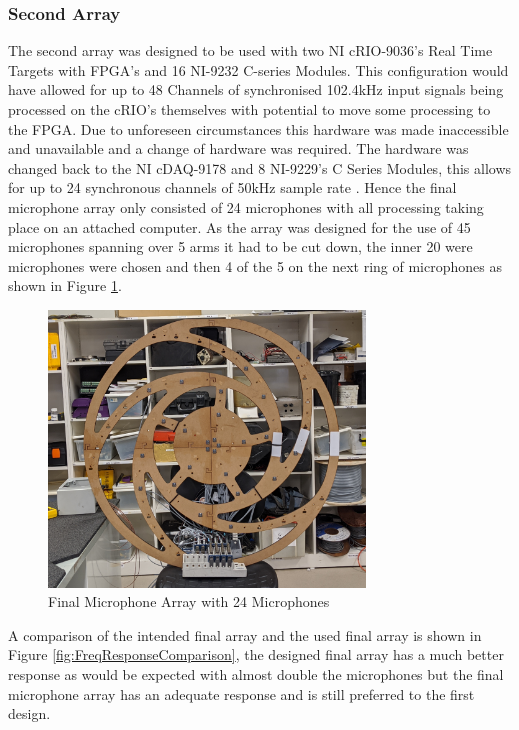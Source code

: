 \documentclass{UoNMCHA}
\numberwithin{equation}{section}
\begin{document}
\subsubsection{Second Array} \label{sec:Second Design DAQ}
    The second array was designed to be used with two NI cRIO-9036's Real Time Targets with FPGA's and 16 NI-9232 C-series Modules. This configuration would have allowed for up to 48 Channels of synchronised 102.4kHz input signals being processed on the cRIO's themselves with potential to move some processing to the FPGA. Due to unforeseen circumstances this hardware was made inaccessible and unavailable and a change of hardware was required. The hardware was changed back to the NI cDAQ-9178 and 8 NI-9229's C Series Modules, this allows for up to 24 synchronous channels of 50kHz sample rate \citep{NI9229}. Hence the final microphone array only consisted of 24 microphones with all processing taking place on an attached computer. As the array was designed for the use of 45 microphones spanning over 5 arms it had to be cut down, the inner 20 were microphones were chosen and then 4 of the 5 on the next ring of microphones as shown in Figure \ref{fig:FinalBuild}.
    
    \begin{figure} [H]
        \centering
        \includegraphics[keepaspectratio, width = 0.75\textwidth]{Figures/FinalArrayBuilt.png}
        \caption{Final Microphone Array with 24 Microphones}
        \label{fig:FinalBuild}
    \end{figure}
    
    A comparison of the intended final array and the used final array is shown in Figure \ref{fig:FreqResponseComparison}, the designed final array has a much better response as would be expected with almost double the microphones but the final microphone array has an adequate response and is still preferred to the first design.
    
\end{document}
